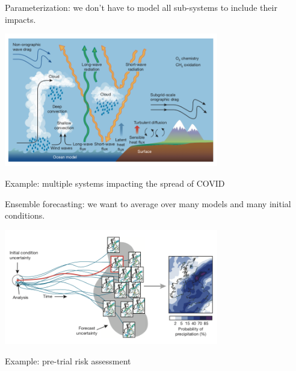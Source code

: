\documentclass[aspectratio=169]{beamer}
\begin{document}
\begin{frame}

Parameterization: we don't have to model all sub-systems to include their impacts.

\pause
\begin{center}
\includegraphics[width = 0.7\textwidth]{figures/bauer_quiet_2015_fig2}
\end{center}

\vfill
Example: multiple systems impacting the spread of COVID

\end{frame}
\begin{frame}

Ensemble forecasting: we want to average over many models and many initial conditions.

\begin{center}
\includegraphics[width = 0.7\textwidth]{figures/bauer_quiet_2015_fig3}
\end{center}

\vfill
Example: pre-trial risk assessment 

\end{frame}
\end{document}
